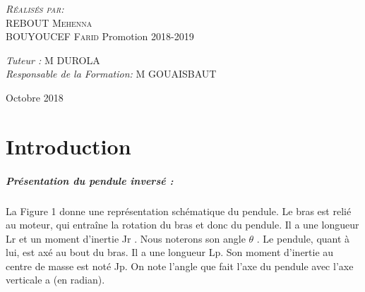 \documentclass[12pt, a4paper, openany]{report}
\begin{document}
\begin{titlepage}
\begin{sffamily}
\begin{center}
    \begin{minipage}{0.4\textwidth}
      \begin{flushleft} \large
         \textsc{\emph {Réalisés par:} \\REBOUT Mehenna}\\
         \textsc{BOUYOUCEF Farid}   
          \newline
          Promotion 2018-2019 \\
      \end{flushleft}
    \end{minipage}
    \begin{minipage}{0.4\textwidth}
      \begin{flushright} \large
        \emph{Tuteur :}  \textsc{M DUROLA}\\
        \emph{Responsable de la Formation:} \textsc{M GOUAISBAUT}
      \end{flushright}
    \end{minipage}

    \vfill

    {\large Octobre 2018}

  \end{center}
  \end{sffamily}      
          
  \end{titlepage}
  
\makeatother




   
\renewcommand{\contentsname}{Sommaire}
\tableofcontents



\chapter*{Introduction}

\paragraph{Présentation du pendule inversé :} La Figure 1 donne une représentation schématique du pendule. Le bras est relié au moteur, qui entraîne la rotation du bras et donc du pendule. Il a une longueur L{r} et un moment d'inertie J{r} . Nous noterons son angle $\theta$ . Le pendule, quant à lui, est axé au bout du bras. Il a une longueur L{p}. Son moment d'inertie au centre de masse est noté J{p}. On note l'angle que fait l'axe du pendule avec l'axe verticale a (en radian).
\end{document}
